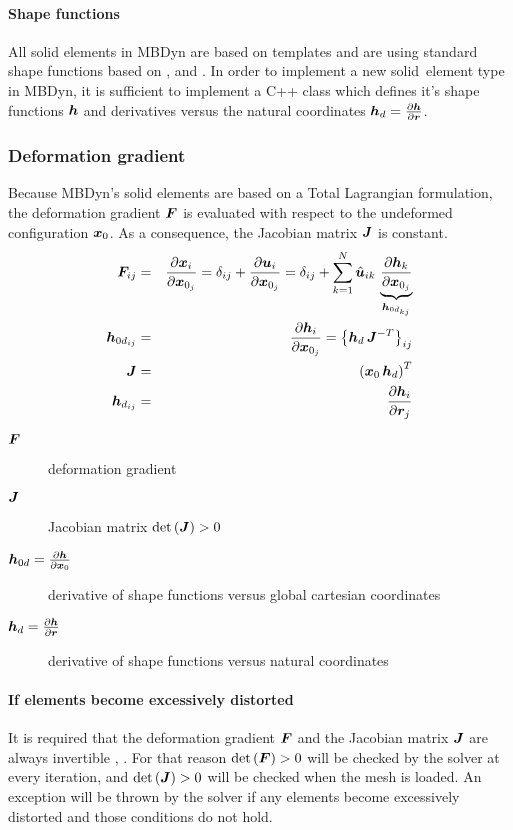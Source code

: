 \paragraph{Shape functions}
All solid elements in MBDyn are based on templates and are using standard shape functions based on \cite{BATHE2016}, \cite{DHONDT2004} and \cite{CODEASTERR30301}.
In order to implement a new solid~element type in MBDyn, it is sufficient to implement a C++ class which defines it's shape functions $\bm{h}$
and derivatives versus the natural coordinates $\bm{h}_d=\frac{\partial \bm{h}}{\partial \bm{r}}$.

\subsubsection{Deformation gradient}
Because MBDyn's solid elements are based on a Total Lagrangian formulation, the deformation gradient $\bm{F}$ is evaluated with respect to the undeformed configuration $\bm{x}_0$.
As a consequence, the Jacobian matrix $\bm{J}$ is constant.
\begin{eqnarray}
  \bm{F}_{ij} & = & \frac{\partial \bm{x}_{i}}{\partial \bm{x}_{0_j}} = \delta_{ij} + \frac{\partial \bm{u}_i}{\partial \bm{x}_{0_j}} = \delta_{ij} + \sum_{k=1}^N\hat{\bm{u}}_{ik} \, \underbrace{\frac{\partial \bm{h}_k}{\partial \bm{x}_{0_j}}}_{\bm{h}_{{0d}_{kj}}} \\
  \bm{h}_{0d_{ij}} & = & \frac{\partial \bm{h}_i}{\partial \bm{x}_{0_j}} = \left\{\bm{h}_{d}\,\bm{J}^{-T}\right\}_{ij} \\
  \bm{J} & = & \left(\bm{x}_0 \, \bm{h}_d\right)^T \\
  \bm{h}_{d_{ij}} & = & \frac{\partial \bm{h}_i}{\partial \bm{r}_j}
\end{eqnarray}
\begin{description}
\item[$\bm{F}$] deformation gradient
\item[$\bm{J}$] Jacobian matrix $\det{\left(\bm{J}\right)}>0$
\item[$\bm{h}_{0d}=\frac{\partial \bm{h}}{\partial \bm{x}_0}$] derivative of shape functions versus global cartesian coordinates
\item[$\bm{h}_d=\frac{\partial \bm{h}}{\partial \bm{r}}$] derivative of shape functions versus natural coordinates
\end{description}
\paragraph{If elements become excessively distorted}
It is required that the deformation gradient $\bm{F}$ and the Jacobian matrix $\bm{J}$ are always invertible \cite{BATHE2016}, \cite{KUEBLER2005}.
For that reason $\det{\left(\bm{F}\right)}>0$ will be checked by the solver at every iteration, and $\det{\left(\bm{J}\right)}>0$ will be checked
when the mesh is loaded. An exception will be thrown by the solver if any elements become excessively distorted and those conditions do not hold.

